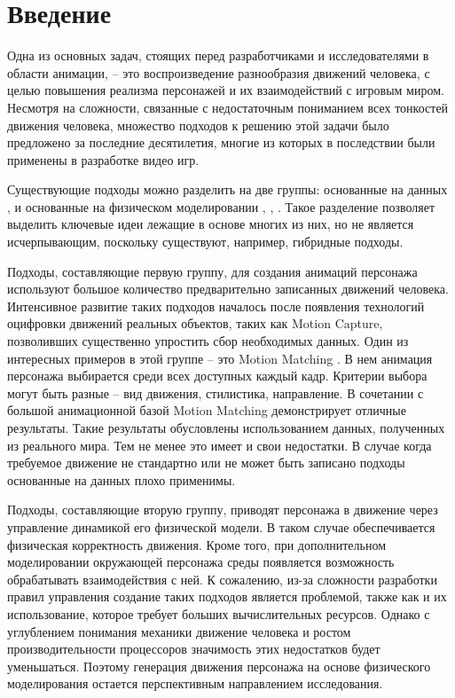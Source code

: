 \section{Введение}

Одна из основных задач, стоящих перед разработчиками и исследователями в области анимации, -- это воспроизведение разнообразия движений человека, с целью повышения реализма персонажей и их взаимодействий с игровым миром. Несмотря на сложности, связанные с недостаточным пониманием всех тонкостей движения человека, множество подходов к решению этой задачи было предложено за последние десятилетия, многие из которых в последствии были применены в разработке видео игр.

Существующие подходы можно разделить на две группы: основанные на данных \cite{AkikanFO}, \cite{KovarGP} и основанные на физическом моделировании \cite{AbeSP}, \cite{MacchiettoZS}, \cite{YinLP}. Такое разделение позволяет выделить ключевые идеи лежащие в основе многих из них, но не является исчерпывающим, поскольку существуют, например, гибридные подходы.

Подходы, составляющие первую группу, для создания анимаций персонажа используют большое количество предварительно записанных движений человека. Интенсивное развитие таких подходов началось после появления технологий оцифровки движений реальных объектов, таких как Motion Capture, позволивших существенно упростить сбор необходимых данных. Один из интересных примеров в этой группе -- это Motion Matching \cite{MotionMatching}. В нем анимация персонажа выбирается среди всех доступных каждый кадр. Критерии выбора могут быть разные -- вид движения, стилистика, направление. В сочетании с большой анимационной базой Motion Matching демонстрирует отличные результаты. Такие результаты обусловлены использованием данных, полученных из реального мира. Тем не менее это имеет и свои недостатки. В случае когда требуемое движение не стандартно или не может быть записано подходы основанные на данных плохо применимы.

Подходы, составляющие вторую группу, приводят персонажа в движение через управление динамикой его физической модели. В таком случае обеспечивается физическая корректность движения. Кроме того, при дополнительном моделировании окружающей персонажа среды появляется возможность обрабатывать взаимодействия с ней. К сожалению, из-за сложности разработки правил управления создание таких подходов является проблемой, также как и их использование, которое требует больших вычислительных ресурсов. Однако с углублением понимания механики движение человека и ростом производительности процессоров значимость этих недостатков будет уменьшаться. Поэтому генерация движения персонажа на основе физического моделирования остается перспективным направлением исследования.

